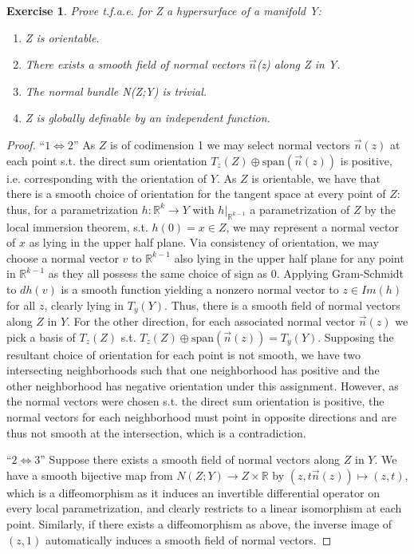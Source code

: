 \documentclass{article}
\newtheorem{exercise}{Exercise}
\begin{document}
\pagebreak

\begin{exercise}
  Prove t.f.a.e. for Z a hypersurface of a manifold Y:
  \begin{enumerate}
  \item Z is orientable.
  \item There exists a smooth field of normal vectors $\vec{n}$(z) along Z in Y.
  \item The normal bundle N(Z;Y) is trivial.
  \item Z is globally definable by an independent function.
  \end{enumerate}
\end{exercise}

\begin{proof}
  ``$1 \iff 2$'' As $Z$ is of codimension 1 we may select normal vectors $\vec{n}(z)$ at each point s.t. the direct sum orientation $T_{z}(Z) \oplus \text{span}(\vec{n}(z))$ is positive, i.e. corresponding with the orientation of $Y$. As $Z$ is orientable, we have that there is a smooth choice of orientation for the tangent space at every point of $Z$: thus, for a parametrization $h: \mathbb{R}^{k} \to Y$ with $h|_{\mathbb{R}^{k-1}}$ a parametrization of $Z$ by the local immersion theorem, s.t. $h(0) = x \in Z$, we may represent a normal vector of $x$ as lying in the upper half plane. Via consistency of orientation, we may choose a normal vector $v$ to $\mathbb{R}^{k-1}$ also lying in the upper half plane for any point in $\mathbb{R}^{k-1}$ as they all possess the same choice of sign as 0. Applying Gram-Schmidt to $dh(v)$ is a smooth function yielding a nonzero normal vector to $z \in Im(h)$ for all $z$, clearly lying in $T_{y}(Y)$. Thus, there is a smooth field of normal vectors along $Z$ in $Y$. For the other direction, for each associated normal vector $\vec{n}(z)$ we pick a basis of $T_{z}(Z)$ s.t. $T_{z}(Z) \oplus \text{span}(\vec{n}(z)) = T_{y}(Y)$. Supposing the resultant choice of orientation for each point is not smooth, we have two intersecting neighborhoods such that one neighborhood has positive and the other neighborhood has negative orientation under this assignment. However, as the normal vectors were chosen s.t. the direct sum orientation is positive, the normal vectors for each neighborhood must point in opposite directions and are thus not smooth at the intersection, which is a contradiction. \newline

``$2 \iff 3$'' Suppose there exists a smooth field of normal vectors along $Z$ in $Y$. We have a smooth bijective map from $N(Z;Y) \to Z \times \mathbb{R}$ by $(z, t \vec{n}(z)) \mapsto (z,t)$, which is a diffeomorphism as it induces an invertible differential operator on every local parametrization, and clearly restricts to a linear isomorphism at each point. Similarly, if there exists a diffeomorphism as above, the inverse image of $(z, 1)$ automatically induces a smooth field of normal vectors. \newline


\end{proof}
\end{document}
